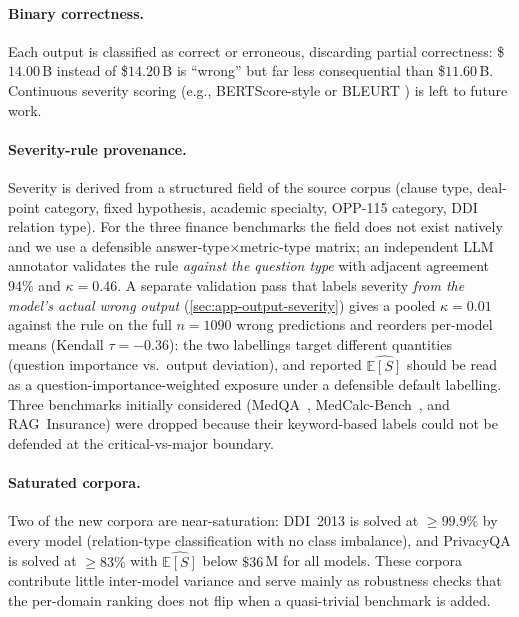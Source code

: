 \documentclass[11pt]{article}
\newcommand{\ES}{\mathbb{E}[S]}
\begin{document}
\paragraph{Binary correctness.}
Each output is classified as correct or erroneous, discarding
partial correctness: \$$14.00$\,B instead of \$$14.20$\,B is
\enquote{wrong} but far less consequential than \$$11.60$\,B.
Continuous severity scoring (e.g., BERTScore-style
\citep{zhang2020bertscore} or BLEURT \citep{sellam2020bleurt})
is left to future work.

\paragraph{Severity-rule provenance.}
Severity is derived from a structured field of the source corpus
(clause type, deal-point category, fixed hypothesis, academic
specialty, OPP-115 category, DDI relation type). For the three
finance benchmarks the field does not exist natively and we use
a defensible answer-type$\times$metric-type matrix; an
independent LLM annotator validates the rule \emph{against the
question type} with adjacent agreement $94\%$ and $\kappa{=}0.46$.
A separate validation pass that labels severity \emph{from the
model's actual wrong output} (\autoref{sec:app-output-severity})
gives a pooled $\kappa = 0.01$ against the rule on the full
$n = 1090$ wrong predictions and reorders per-model means
(Kendall $\tau = -0.36$): the two labellings target different
quantities (question importance vs.\ output deviation), and
reported $\widehat{\ES}$ should be read as a
question-importance-weighted exposure under a defensible default
labelling. Three benchmarks initially considered
(MedQA~\citep{jin2021medqa},
MedCalc-Bench~\citep{kazi2024medcalc}, and RAG~Insurance) were
dropped because their keyword-based labels could not be
defended at the critical-vs-major boundary.

\paragraph{Saturated corpora.}
Two of the new corpora are near-saturation: DDI~2013 is solved
at $\ge 99.9\%$ by every model (relation-type classification with
no class imbalance), and PrivacyQA is solved at $\ge 83\%$ with
$\widehat{\ES}$ below $\$36$\,M for all models. These corpora
contribute little inter-model variance and serve mainly as
robustness checks that the per-domain ranking does not flip when
a quasi-trivial benchmark is added.
\end{document}
